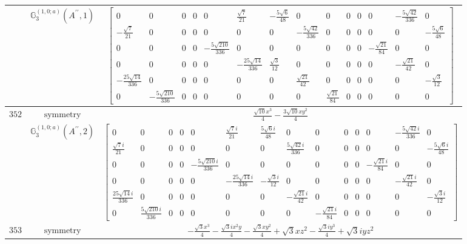 \documentclass[fleqn,8pt,landscape]{jsarticle}
\begin{document}
\begin{longtable}{ccc}
$  $ & $ \mathbb{G}_{3}^{(1,0;a)}(A^{\prime\prime},1) $ & $ \begin{bmatrix} 0 & 0 & 0 & 0 & 0 & \frac{\sqrt{7}}{21} & - \frac{5 \sqrt{6}}{48} & 0 & 0 & 0 & 0 & 0 & - \frac{5 \sqrt{42}}{336} & 0 \\ - \frac{\sqrt{7}}{21} & 0 & 0 & 0 & 0 & 0 & 0 & - \frac{5 \sqrt{42}}{336} & 0 & 0 & 0 & 0 & 0 & - \frac{5 \sqrt{6}}{48} \\ 0 & 0 & 0 & 0 & - \frac{5 \sqrt{210}}{336} & 0 & 0 & 0 & 0 & 0 & 0 & - \frac{\sqrt{21}}{84} & 0 & 0 \\ 0 & 0 & 0 & 0 & 0 & - \frac{25 \sqrt{14}}{336} & \frac{\sqrt{3}}{12} & 0 & 0 & 0 & 0 & 0 & - \frac{\sqrt{21}}{42} & 0 \\ - \frac{25 \sqrt{14}}{336} & 0 & 0 & 0 & 0 & 0 & 0 & \frac{\sqrt{21}}{42} & 0 & 0 & 0 & 0 & 0 & - \frac{\sqrt{3}}{12} \\ 0 & - \frac{5 \sqrt{210}}{336} & 0 & 0 & 0 & 0 & 0 & 0 & \frac{\sqrt{21}}{84} & 0 & 0 & 0 & 0 & 0 \end{bmatrix} $ \\ \hline
$ 352 $ & $ \text{symmetry} $ & $ \frac{\sqrt{10} x^{3}}{4} - \frac{3 \sqrt{10} x y^{2}}{4} $ \\
$  $ & $ \mathbb{G}_{3}^{(1,0;a)}(A^{\prime\prime},2) $ & $ \begin{bmatrix} 0 & 0 & 0 & 0 & 0 & \frac{\sqrt{7} i}{21} & \frac{5 \sqrt{6} i}{48} & 0 & 0 & 0 & 0 & 0 & - \frac{5 \sqrt{42} i}{336} & 0 \\ \frac{\sqrt{7} i}{21} & 0 & 0 & 0 & 0 & 0 & 0 & \frac{5 \sqrt{42} i}{336} & 0 & 0 & 0 & 0 & 0 & - \frac{5 \sqrt{6} i}{48} \\ 0 & 0 & 0 & 0 & - \frac{5 \sqrt{210} i}{336} & 0 & 0 & 0 & 0 & 0 & 0 & - \frac{\sqrt{21} i}{84} & 0 & 0 \\ 0 & 0 & 0 & 0 & 0 & - \frac{25 \sqrt{14} i}{336} & - \frac{\sqrt{3} i}{12} & 0 & 0 & 0 & 0 & 0 & - \frac{\sqrt{21} i}{42} & 0 \\ \frac{25 \sqrt{14} i}{336} & 0 & 0 & 0 & 0 & 0 & 0 & - \frac{\sqrt{21} i}{42} & 0 & 0 & 0 & 0 & 0 & - \frac{\sqrt{3} i}{12} \\ 0 & \frac{5 \sqrt{210} i}{336} & 0 & 0 & 0 & 0 & 0 & 0 & - \frac{\sqrt{21} i}{84} & 0 & 0 & 0 & 0 & 0 \end{bmatrix} $ \\ \hline
$ 353 $ & $ \text{symmetry} $ & $ - \frac{\sqrt{3} x^{3}}{4} - \frac{\sqrt{3} i x^{2} y}{4} - \frac{\sqrt{3} x y^{2}}{4} + \sqrt{3} x z^{2} - \frac{\sqrt{3} i y^{3}}{4} + \sqrt{3} i y z^{2} $ \\

\end{longtable}
\end{document}
